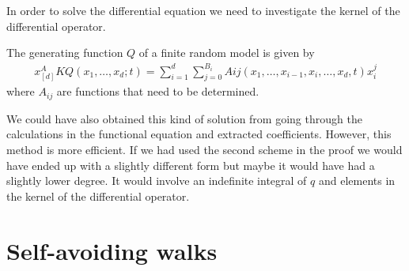 In order to solve the differential equation we need to investigate the kernel of the differential operator.
\begin{corollary}
The generating function $Q$ of a finite random model is given by
\begin{align}
	x_{[d]}^{A}KQ(x_1,\ldots,x_d;t) = \sum_{i=1}^d \sum_{j=0}^{B_i}Aij(x_1,\ldots,x_{i-1},x_i,\ldots, x_d,t) x_i^j
\end{align}
where $A_{ij}$ are functions that need to be determined.
\end{corollary}
We could have also obtained this kind of solution from going through the calculations in the functional equation and extracted coefficients. However, this method is more efficient. If we had used the second scheme in the proof we would have ended up with a slightly different form but maybe it would have had a slightly lower degree. It would involve an indefinite integral of $q$ and elements in the kernel of the differential operator.

\section{Self-avoiding walks}

